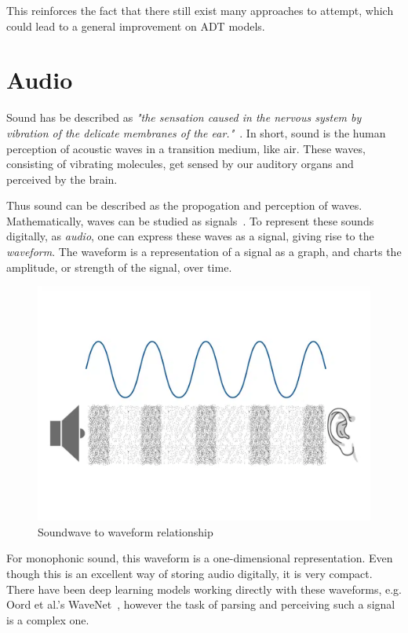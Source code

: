 This reinforces the fact that there still exist many approaches to attempt, which could lead to a general improvement on \gls{ADT} models.

\section{Audio}

Sound has be described as \textit{"the sensation caused in the nervous system by vibration of the delicate membranes of the ear."}~\cite{1953fundamentals}. In short, sound is the human perception of acoustic waves in a transition medium, like air. These waves, consisting of vibrating molecules, get sensed by our auditory organs and perceived by the brain. 

Thus sound can be described as the propogation and perception of waves. Mathematically, waves can be studied as signals~\cite{8454362}. To represent these sounds digitally, as \textit{audio}, one can express these waves as a signal, giving rise to the \textit{waveform}. The waveform is a representation of a signal as a graph, and charts the amplitude, or strength of the signal, over time.

\begin{figure}[H]
    \centering
    \includegraphics[scale=0.3]{figures/waveform}
    \caption{Soundwave to waveform relationship}
    \label{WaveformFigure}
\end{figure}

For monophonic sound, this waveform is a one-dimensional representation. Even though this is an excellent way of storing audio digitally, it is very compact. There have been deep learning models working directly with these waveforms, e.g. Oord et al.'s WaveNet~\cite{oord2016wavenetgenerativemodelraw}, however the task of parsing and perceiving such a signal is a complex one.

